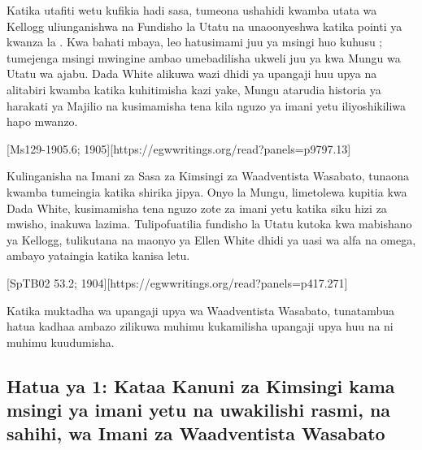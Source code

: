 
Katika utafiti wetu kufikia hadi sasa, tumeona ushahidi kwamba utata wa Kellogg uliunganishwa na Fundisho la Utatu na  unaoonyeshwa katika pointi ya kwanza la . Kwa bahati mbaya, leo hatusimami juu ya msingi huo kuhusu ; tumejenga msingi mwingine ambao umebadilisha ukweli juu ya  kwa Mungu wa Utatu wa ajabu. Dada White alikuwa wazi dhidi ya upangaji huu upya na alitabiri kwamba katika kuhitimisha kazi yake, Mungu atarudia historia ya harakati ya Majilio na kusimamisha tena kila nguzo ya imani yetu iliyoshikiliwa hapo mwanzo.

[Ms129-1905.6; 1905][https://egwwritings.org/read?panels=p9797.13]

Kulinganisha  na Imani za Sasa za Kimsingi za Waadventista Wasabato, tunaona kwamba tumeingia katika shirika jipya. Onyo la Mungu, limetolewa kupitia kwa Dada White, kusimamisha tena nguzo zote za imani yetu katika siku hizi za mwisho, inakuwa lazima. Tulipofuatilia fundisho la Utatu kutoka kwa mabishano ya Kellogg, tulikutana na maonyo ya Ellen White dhidi ya uasi wa alfa na omega, ambayo yataingia katika kanisa letu.

[SpTB02 53.2; 1904][https://egwwritings.org/read?panels=p417.271]

Katika muktadha wa upangaji upya wa Waadventista Wasabato, tunatambua hatua kadhaa ambazo zilikuwa muhimu kukamilisha upangaji upya huu na ni muhimu kuudumisha.

\subsection*{Hatua ya 1: Kataa Kanuni za Kimsingi kama msingi ya imani yetu na uwakilishi rasmi, na sahihi, wa Imani za Waadventista Wasabato}

